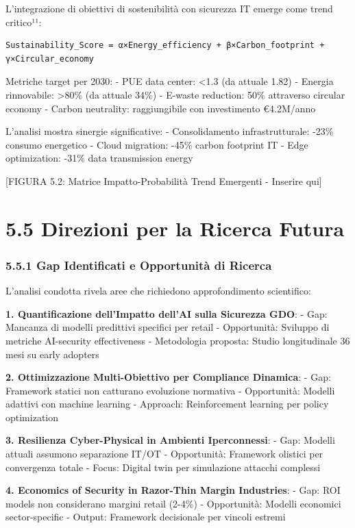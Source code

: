 \documentclass[12pt,a4paper,oneside]{book}
\begin{document}
L'integrazione di obiettivi di sostenibilità con sicurezza IT emerge
come trend critico¹¹:

\begin{verbatim}
Sustainability_Score = α×Energy_efficiency + β×Carbon_footprint + γ×Circular_economy
\end{verbatim}

Metriche target per 2030: - PUE data center: \textless1.3 (da attuale
1.82) - Energia rinnovabile: \textgreater80\% (da attuale 34\%) -
E-waste reduction: 50\% attraverso circular economy - Carbon neutrality:
raggiungibile con investimento €4.2M/anno

L'analisi mostra sinergie significative: - Consolidamento
infrastrutturale: -23\% consumo energetico - Cloud migration: -45\%
carbon footprint IT - Edge optimization: -31\% data transmission energy

{[}FIGURA 5.2: Matrice Impatto-Probabilità Trend Emergenti - Inserire
qui{]}

\section{5.5 Direzioni per la Ricerca
Futura}\label{direzioni-per-la-ricerca-futura}

\subsubsection{5.5.1 Gap Identificati e Opportunità di
Ricerca}\label{gap-identificati-e-opportunituxe0-di-ricerca}

L'analisi condotta rivela aree che richiedono approfondimento
scientifico:

\textbf{1. Quantificazione dell'Impatto dell'AI sulla Sicurezza GDO}: -
Gap: Mancanza di modelli predittivi specifici per retail - Opportunità:
Sviluppo di metriche AI-security effectiveness - Metodologia proposta:
Studio longitudinale 36 mesi su early adopters

\textbf{2. Ottimizzazione Multi-Obiettivo per Compliance Dinamica}: -
Gap: Framework statici non catturano evoluzione normativa - Opportunità:
Modelli adattivi con machine learning - Approach: Reinforcement learning
per policy optimization

\textbf{3. Resilienza Cyber-Physical in Ambienti Iperconnessi}: - Gap:
Modelli attuali assumono separazione IT/OT - Opportunità: Framework
olistici per convergenza totale - Focus: Digital twin per simulazione
attacchi complessi

\textbf{4. Economics of Security in Razor-Thin Margin Industries}: -
Gap: ROI models non considerano margini retail (2-4\%) - Opportunità:
Modelli economici sector-specific - Output: Framework decisionale per
vincoli estremi
\end{document}
